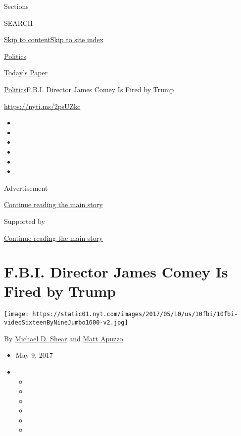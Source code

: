 Sections

SEARCH

\protect\hyperlink{site-content}{Skip to
content}\protect\hyperlink{site-index}{Skip to site index}

\href{https://www.nytimes.com/section/politics}{Politics}

\href{https://myaccount.nytimes.com/auth/login?response_type=cookie\&client_id=vi}{}

\href{https://www.nytimes.com/section/todayspaper}{Today's Paper}

\href{/section/politics}{Politics}\textbar{}F.B.I. Director James Comey
Is Fired by Trump

\url{https://nyti.ms/2psUZkc}

\begin{itemize}
\item
\item
\item
\item
\item
\item
\end{itemize}

Advertisement

\protect\hyperlink{after-top}{Continue reading the main story}

Supported by

\protect\hyperlink{after-sponsor}{Continue reading the main story}

\hypertarget{fbi-director-james-comey-is-fired-by-trump}{%
\section{F.B.I. Director James Comey Is Fired by
Trump}\label{fbi-director-james-comey-is-fired-by-trump}}

\texttt{[image: https://static01.nyt.com/images/2017/05/10/us/10fbi/10fbi-videoSixteenByNineJumbo1600-v2.jpg]}

By \href{http://www.nytimes.com/by/michael-d-shear}{Michael D. Shear}
and \href{http://www.nytimes.com/by/matt-apuzzo}{Matt Apuzzo}

\begin{itemize}
\item
  May 9, 2017
\item
  \begin{itemize}
  \item
  \item
  \item
  \item
  \item
  \item
  \end{itemize}
\end{itemize}

